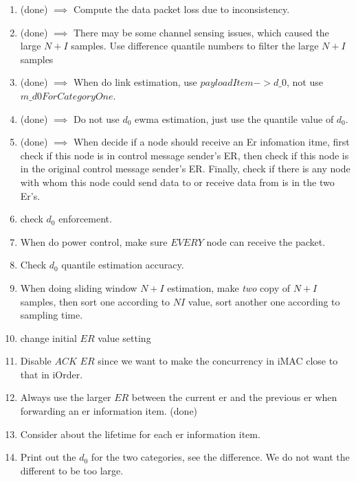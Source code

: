 \begin{enumerate}
\item (done) $\implies$ Compute the data packet loss due to inconsistency.
\item (done) $\implies$ There may be some channel sensing issues, which caused the large $N+I$ samples. Use difference quantile numbers to filter the large $N+I$ samples
\item (done) $\implies$ When do link estimation, use $payloadItem->d\_0$, not use $m\_d0ForCategoryOne$.
\item (done) $\implies$ Do not use $d_0$ ewma estimation, just use the quantile value of $d_0$.
\item (done) $\implies$ When decide if a node should receive an Er infomation itme, first check if this node is in control message sender's ER, then check if this node is in the original control message sender's ER. Finally, check if there is any node with whom this node could send data to or receive data from is in the two Er's.
\item check $d_0$ enforcement. 
\item When do power control, make sure $EVERY$ node can receive the packet.
\item Check $d_0$ quantile estimation accuracy.
\item When doing sliding window $N+I$ estimation, make \emph{two} copy of $N+I$ samples, then sort one according to $NI$ value, sort another one according to sampling time.
\item change initial $ER$ value setting
\item Disable $ACK$ $ER$ since we want to make the concurrency in iMAC close to that in iOrder.
\item Always use the larger $ER$ between the current er and the previous er when forwarding an er information item.  (done)
\item Consider about the lifetime for each er information item.
\item Print out the $d_0$ for the two categories, see the difference. We do not want the different to be too large. 
\end{enumerate}

